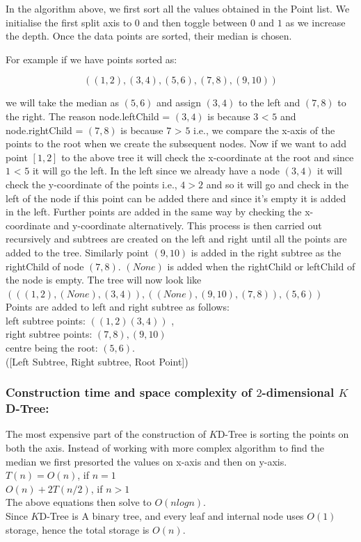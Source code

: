In the algorithm above, we first sort all the values obtained in the Point list. We initialise the first split axis to $0$ and then toggle between $0$ and $1$ as we increase the depth. Once the data points are sorted, their median is chosen. 
\begin{mscexample}
    For example if we have points sorted as: 

                $$((1,2),(3,4),(5,6),(7,8),(9,10))$$
    
    we will take the median as $(5,6)$ and assign $(3,4)$ to the left and $(7,8)$ to the right. The reason node.leftChild = $(3,4)$ is because $3$ < $5$ and node.rightChild = $(7,8)$ is because $7$ > $5$ i.e., we compare the x-axis of the points to the root when we create the subsequent nodes. Now if we want to add point $[1,2]$ to the above tree it will check the x-coordinate at the root and since $1$ < $5$ it will go the left. In the left since we already have a node $(3,4)$ it will check the y-coordinate of the points i.e., $4>2$ and so it will go and check in the left of the node if this point can be added there and since it's empty it is added in the left. Further points are added in the same way by checking the x-coordinate and y-coordinate alternatively. This process is then carried out recursively and subtrees are created on the left and right until all the points are added to the tree. Similarly point $(9,10)$ is added in the right subtree as the rightChild of
    node $(7,8)$. $(None)$ is added when the rightChild or leftChild of the node is empty. The tree will now look like\\

    $(((1,2),(None),(3,4)),((None),(9,10),(7,8)),(5,6))$\\

    Points are added to left and right subtree as follows:\\
    left subtree points: $((1,2)(3,4))$ ,\\
    right subtree points: $(7,8),(9,10)$ \\ 
    centre being the root: $(5,6)$. \\
    ([Left Subtree, Right subtree, Root Point])
\end{mscexample}

\subsubsection{Construction time and space complexity of $2$-dimensional $K$D-Tree:}

The most expensive part of the construction of $K$D-Tree is sorting the points on both the axis. Instead of working with more complex algorithm to find the median we first presorted the values on x-axis and then on y-axis.\\
$T(n) = O(n)$, if $n = 1$\\
$O(n) + 2T(n/2)$, if $n > 1$\\
The above equations then solve to $O( n log n)$.\\

Since $K$D-Tree is A binary tree, and every leaf and internal node uses $O(1)$ storage, hence the total storage is $O(n)$.


